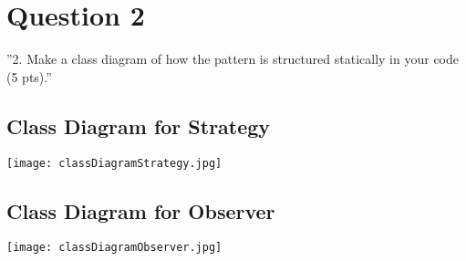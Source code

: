 \section{Question 2}

''2. Make a class diagram of how the pattern is structured statically in your code (5 pts).''

\subsection{Class Diagram for Strategy}

\texttt{[image: classDiagramStrategy.jpg]}

\subsection{Class Diagram for Observer}

\texttt{[image: classDiagramObserver.jpg]}